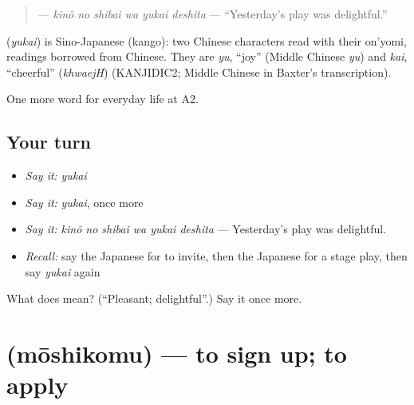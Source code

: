 \begin{quote}
\textbf{  } — \emph{kinō no shibai wa yukai deshita} — \textquotedblleft{}Yesterday's play was delightful.\textquotedblright{}
\end{quote}

\begin{cousinweb}
\textbf{} (\emph{yukai}) is Sino-Japanese (kango): two Chinese characters read with their on'yomi, readings borrowed from Chinese. They are \emph{yu}, \textquotedblleft{}joy\textquotedblright{} (Middle Chinese \emph{yu}) and \emph{kai}, \textquotedblleft{}cheerful\textquotedblright{} (\emph{khwaejH}) (KANJIDIC2; Middle Chinese in Baxter's transcription).
\end{cousinweb}

\begin{grammarlens}[title={What you've built}]
One more word for everyday life at A2.
\end{grammarlens}

\subsection*{Your turn}
\begin{itemize}
\raggedright
  \item \emph{Say it:} \emph{yukai}
  \item \emph{Say it:} \emph{yukai}, once more
  \item \emph{Say it:} \emph{kinō no shibai wa yukai deshita} — Yesterday's play was delightful.
  \item \emph{Recall:} say the Japanese for to invite, then the Japanese for a stage play, then say \emph{yukai} again
\end{itemize}

\begin{tcolorbox}[breakable,colback=teal!4,colframe=teal!35!black,title={Before you move on}]
What does  mean? (\textquotedblleft{}Pleasant; delightful\textquotedblright{}.) Say it once more.
\end{tcolorbox}
\section[\texorpdfstring{\ja{もうしこむ} (mōshikomu)}{もうしこむ (mōshikomu)}]{ (mōshikomu) — to sign up; to apply}

\label{lesson:JA-C241-moushikomu}



